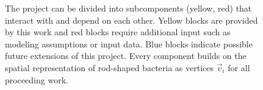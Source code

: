 \documentclass{article}
\begin{document}

\begin{figure}[H]
    \centering
    
    \caption{
        The project can be divided into subcomponents (yellow, red) that interact with and depend on
        each other.
        Yellow blocks are provided by this work and red blocks require additional input such as
        modeling assumptions or input data.
        Blue blocks indicate possible future extensions of this project.
        Every component builds on the spatial representation of rod-shaped bacteria as vertices
        $\vec{v}_i$ for all proceeding work.
    }
    \label{fig:flowchart-project-structure}
\end{figure}
\end{document}

